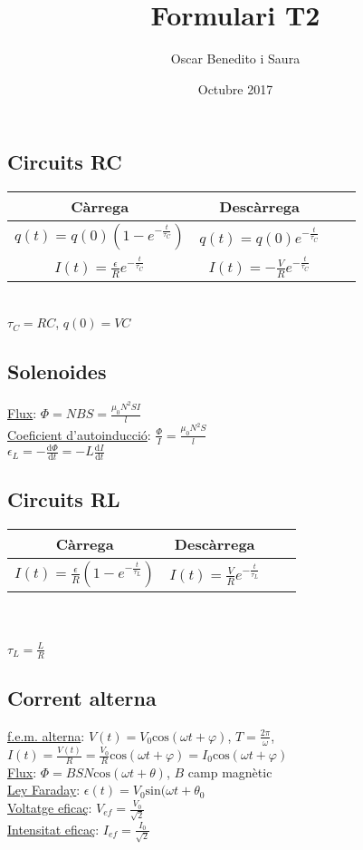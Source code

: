 \documentclass[12pt]{article}
\title{Formulari T2}
\author{Oscar Benedito i Saura}
\date{Octubre 2017}
\theoremstyle{normal}
\theoremstyle{break}
\theoremstyle{breakthm}
\begin{document}
\begin{multicols}{2}
\subsection*{Circuits RC}

\begin{tabular}{|c|c|c|c|}
    \hline
    Càrrega & Descàrrega \\ \hline \hline
    $q(t) = q(0)\left( 1 - e^{-\frac{t}{\tau_C}}\right)$ & $q(t) = q(0)e^{-\frac{t}{\tau_C}}$ \\ \hline
    $I(t) = \frac{\epsilon}{R} e^{-\frac{t}{\tau_C}}$ & $I(t) = -\frac{V}{R}e^{-\frac{t}{\tau_C}}$ \\ \hline
\end{tabular}
\\

$\tau_C = RC$, $q(0) = VC$

\subsection*{Solenoides}

\underline{Flux}: $\Phi = NBS = \frac{\mu_0 N^2SI}{l}$ \\
\underline{Coeficient d'autoinducció}: $\frac{\Phi}{I} = \frac{\mu_0N^2S}{l}$ \\
$\epsilon_L= -\frac{\text{d}\Phi}{\text{d}t} = -L \frac{\text{d}I}{\text{d}t}$

\subsection*{Circuits RL}

\begin{tabular}{|c|c|c|c|}
    \hline
    Càrrega & Descàrrega \\ \hline \hline
    $I(t) = \frac{\epsilon}{R} \left(1 - e^{-\frac{t}{\tau_L}}\right)$ & $I(t) = \frac{V}{R}e^{-\frac{t}{\tau_L}}$ \\ \hline
\end{tabular} \\ \\
$\tau_L = \frac{L}{R}$

\subsection*{Corrent alterna}
\underline{f.e.m. alterna}: $V(t) = V_0\text{cos}(\omega t+\varphi)$, $T = \frac{2\pi}{\omega}$, $I(t) = \frac{V(t)}{R} = \frac{V_0}{R}\text{cos}(\omega t + \varphi) = I_0\text{cos}(\omega t + \varphi)$ \\
\underline{Flux}: $\Phi = BSN\text{cos}(\omega t+\theta)$, $B$ camp magnètic \\
\underline{Ley Faraday}: $\epsilon(t) = V_0\text{sin}(\omega t + \theta_0$ \\
\underline{Voltatge eficaç}: $V_{ef} = \frac{V_0}{\sqrt{2}}$ \\
\underline{Intensitat eficaç}: $I_{ef} = \frac{I_0}{\sqrt{2}}$


\end{multicols}
\end{document}
